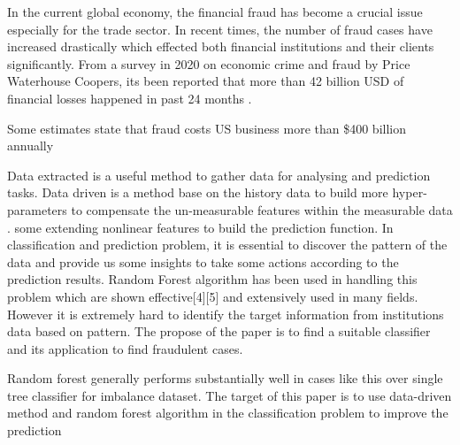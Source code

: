 
In the current global economy, the financial fraud has become a crucial issue especially for the trade sector. In recent times, the number of fraud cases have increased drastically which effected both financial institutions and their clients significantly. From a survey in 2020 on economic crime and fraud by Price Waterhouse Coopers, its been reported that more than 42 billion USD of financial losses happened in past 24 months \cite{PwC.Crime.Survey}.










Some estimates state that fraud costs US business more than \$400 billion annually

Data extracted is a useful method to gather data for analysing and prediction tasks. Data driven is a method base on the history data to build more hyper-parameters to compensate the un-measurable features within the measurable data \cite{SMARRA20181252}. some extending nonlinear features to build the prediction function. In classification and prediction problem, it is essential to discover the pattern of the data and provide us some insights to take some actions according to the prediction results. Random Forest algorithm has been used in handling this problem which are shown effective[4][5] and extensively used in many fields. However it is extremely hard to identify the target information from institutions data based on pattern. The propose of the paper is to find a suitable classifier and its application to find fraudulent cases. 

Random forest generally performs substantially well in cases like this over single tree classifier for imbalance dataset. The target of this paper is to use data-driven method and random forest algorithm in the classification problem to improve the prediction